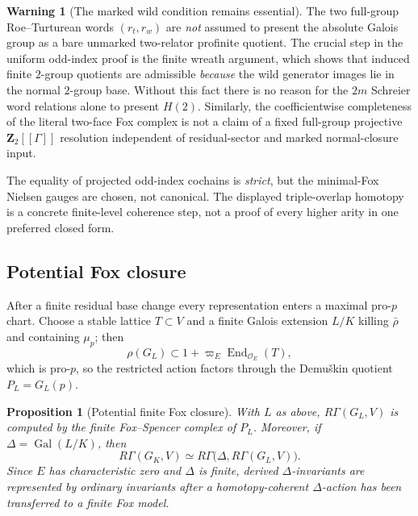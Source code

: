 \documentclass[11pt]{article}
\newtheorem{proposition}[theorem]{Proposition}
\theoremstyle{definition}
\newtheorem{warning}[theorem]{Warning}
\newcommand{\End}{\operatorname{End}}
\newcommand{\Gal}{\operatorname{Gal}}
\begin{document}
\begin{warning}[The marked wild condition remains essential]
\label{warn:dyadic-f135-not-naked-full-relators}
The two full-group
Roe--Turturean
words $(r_t,r_w)$
are \emph{not}
assumed to
present the
absolute Galois
group as a bare
unmarked
two-relator
profinite quotient.
The crucial
step in the
uniform odd-index
proof is the
finite wreath
argument, which
shows that
induced finite
$2$-group
quotients are
admissible
\emph{because}
the wild
generator images
lie in the normal
$2$-group base.
Without this
fact there is
no reason for
the $2m$
Schreier word
relations alone
to present $H(2)$.
Similarly, the
coefficientwise
completeness
of the literal
two-face Fox
complex is not
a claim of a
fixed full-group
projective
$\mathbf Z_2[[\Gamma]]$
resolution
independent of
residual-sector
and marked
normal-closure
input.

The equality
of projected
odd-index
cochains is
\emph{strict},
but the
minimal-Fox
Nielsen gauges
are chosen,
not canonical.
The displayed
triple-overlap
homotopy is
a concrete
finite-level
coherence step,
not a proof of
every higher
arity in one
preferred
closed form.
\end{warning}

\subsection{Potential Fox closure}

After a finite residual base change every representation enters a maximal pro-$p$ chart.  Choose a stable lattice $T\subset V$ and a finite Galois extension $L/K$ killing $\bar\rho$ and containing $\mu_p$; then
\[
\rho(G_L)\subset 1+\varpi_E\End_{\mathcal O_E}(T),
\]
which is pro-$p$, so the restricted action factors through the Demu\v{s}kin quotient $P_L=G_L(p)$.

\begin{proposition}[Potential finite Fox closure]\label{prop:potential-fox-closure}
With $L$ as above, $R\Gamma(G_L,V)$ is computed by the finite Fox--Spencer complex of $P_L$.  Moreover, if $\Delta=\Gal(L/K)$, then
\[
R\Gamma(G_K,V)
\simeq
R\Gamma\bigl(\Delta,R\Gamma(G_L,V)\bigr).
\]
Since $E$ has characteristic zero and $\Delta$ is finite, derived $\Delta$-invariants are represented by ordinary invariants after a homotopy-coherent $\Delta$-action has been transferred to a finite Fox model.
\end{proposition}
\end{document}
